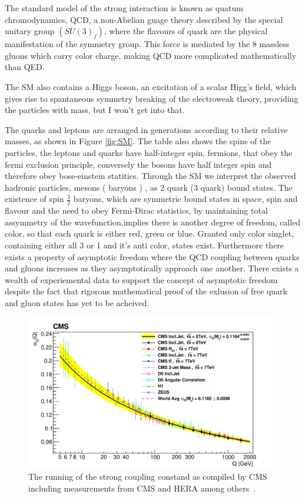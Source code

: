 The standard model of the strong interaction is known as quatum chromodynamics, QCD, a non-Abelian guage theory described by the special unitary group $(SU(3)_f)$, where the  flavours of quark are the physical manifestation of the symmetry group. This force is mediated by the 8 massless gluons which carry color charge, making QCD more complicated mathematically than QED.

The SM also contains a Higgs boson, an excitation of a scalar Higg's field, which gives rise to spantaneous symmetry breaking of the electroweak theory, providing the particles with mass, but I won't get into that. 

The quarks and leptons are arranged in generations according to their relative masses, as shown in Figure \ref{fig:SM}. The table also shows the spins of the particles, the leptons and quarks have half-integer spin, fermions, that obey the fermi exclusion principle, conversely the bosons have half integer spin and therefore obey bose-einstein statitics. Through the SM we interpret the observed hadronic particles, mesons ( baryons ) , as 2 quark (3 quark) bound states. The existence of spin $\frac{3}{2}$ baryons, which are symmetric bound states in space, spin and flavour and the need to obey Fermi-Dirac statistics, by maintaining total assymmetry of the wavefunction,implies there is another degree of freedom, called color, so that each quark is either red, green or blue. Granted only color singlet, containing either all 3 or 1 and it's anti color, states exist. Furthermore there exists a property of asymptotic freedom where the QCD coupling between quarks and gluons increases as they asymptotically approach one another. There exists a wealth of experiemental data to support the concept of asymptotic freedom despite the fact that rigorous mathematical proof of the exlusion of free quark and gluon states has yet to be acheived.




\begin{figure}[htb]
\centering
\includegraphics[width=1.0\textwidth]{visuals/strong-coupling-cms2.png}
\caption{The running of the strong coupling constand as compiled by CMS including measurements from CMS and HERA among others~\cite{CMS:2014mna}.}
\label{fig:alphas}
\end{figure}





